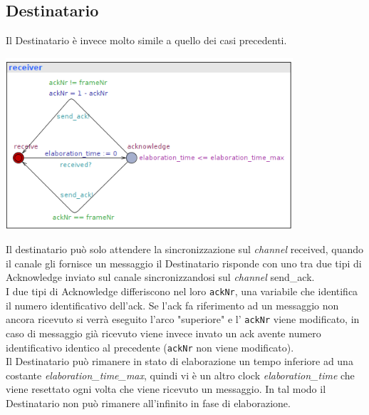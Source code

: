 \documentclass[a4paper]{article}
\newcommand{\channel}{\textit{channel }}
\begin{document}
\subsection{Destinatario}
Il Destinatario è invece molto simile a quello dei casi precedenti.
\begin{center}\includegraphics[width=0.8\textwidth]{2_receiver.png}\end{center}
Il destinatario può solo attendere la sincronizzazione sul \channel received, quando il canale gli fornisce un messaggio il Destinatario risponde con uno tra due tipi di Acknowledge inviato sul canale sincronizzandosi sul \channel send\_ack.\\
I due tipi di Acknowledge differiscono nel loro \texttt{ackNr}, una variabile che identifica il numero identificativo dell'ack.
Se l'ack fa riferimento ad un messaggio non ancora ricevuto si verrà eseguito l'arco "superiore" e l' \texttt{ackNr} viene modificato, in caso di messaggio già ricevuto viene invece invato un ack avente numero identificativo identico al precedente (\texttt{ackNr} non viene modificato).\\
Il Destinatario può rimanere in stato di elaborazione un tempo inferiore ad una costante \textit{elaboration\_time\_max}, quindi vi è un altro clock \textit{elaboration\_time} che viene resettato ogni volta che viene ricevuto un messaggio.
In tal modo il Destinatario non può rimanere all'infinito in fase di elaborazione.
\end{document}
